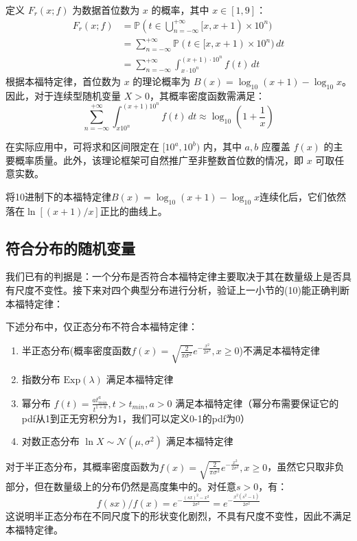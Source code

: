 \documentclass{ctexart} %
\begin{document}
定义 $F_r(x; f)$ 为数据首位数为 $x$ 的概率，其中 $x \in [1, 9]$：
\begin{align*}
    F_r(x; f) &= \mathbb{P}(t \in \bigcup_{n=-\infty}^{+\infty} [x , x+1)\times 10^n) \\
    &= \sum_{n=-\infty}^{+\infty} \mathbb{P}(t \in [x , x+1 )\times 10^n) \, dt \\
    &= \sum_{n=-\infty}^{+\infty} \int_{x \cdot 10^n}^{(x+1) \cdot 10^n} f(t) \, dt
\end{align*}
根据本福特定律，首位数为 $x$ 的理论概率为 $B(x) = \log_{10}(x+1) - \log_{10}x$。因此，对于连续型随机变量 $X>0$，其概率密度函数需满足：
\begin{equation}
\sum_{n=-\infty}^{+\infty} \int_{x10^n}^{(x+1)10^n} f(t) \, dt \approx  \log_{10}(1+\frac{1}{x})
\end{equation}

在实际应用中，可将求和区间限定在 $[10^a, 10^b)$ 内，其中 $a,b$ 应覆盖 $f(x)$ 的主要概率质量。此外，该理论框架可自然推广至非整数首位数的情况，即 $x$ 可取任意实数。

将10进制下的本福特定律$B(x)=\log_{10}(x+1)-\log_{10}x$连续化后，它们依然落在$\ln[(x+1)/x]$正比的曲线上。


\subsection{符合分布的随机变量}

我们已有的判据是：一个分布是否符合本福特定律主要取决于其在数量级上是否具有尺度不变性。接下来对四个典型分布进行分析，验证上一小节的(10)能正确判断本福特定律：

下述分布中，仅正态分布不符合本福特定律：
\begin{enumerate}
    \item 半正态分布(概率密度函数$f(x)=\sqrt{\frac{2}{\pi\sigma^2}}e^{-\frac{x^2}{2\sigma^2}},x\geq0$)不满足本福特定律
    \item 指数分布 $\mathrm{Exp}(\lambda)$ 满足本福特定律
    \item 幂分布 $f(t)=\frac{at_{min}^a}{t^{1+a}}, t>t_{min}, a>0$ 满足本福特定律（幂分布需要保证它的pdf从1到正无穷积分为1，我们可以定义0-1的pdf为0）
    \item 对数正态分布 $\ln X \sim \mathcal{N}(\mu,\sigma^2)$ 满足本福特定律
\end{enumerate}

对于半正态分布，其概率密度函数为$f(x)=\sqrt{\frac{2}{\pi\sigma^2}}e^{-\frac{x^2}{2\sigma^2}},x\geq0$，虽然它只取非负部分，但在数量级上的分布仍然是高度集中的。对任意$s>0$，有：
\[ f(sx)/f(x) = e^{-\frac{(sx)^2-x^2}{2\sigma^2}} = e^{-\frac{x^2(s^2-1)}{2\sigma^2}} \]
这说明半正态分布在不同尺度下的形状变化剧烈，不具有尺度不变性，因此不满足本福特定律。
\end{document}
